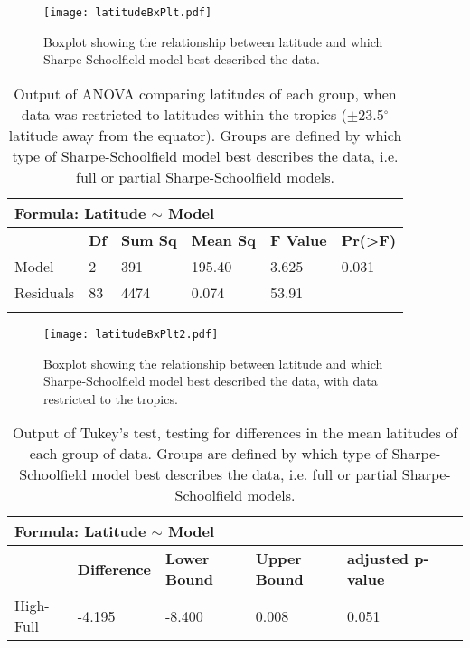\documentclass[a4paper, 11pt]{article}
\begin{document}
\begin{linenumbers}
\begin{figure}[H]
\centering
\texttt{[image: latitudeBxPlt.pdf]}
\caption{\label{fig:bxplt1} Boxplot showing the relationship between latitude and which Sharpe-Schoolfield model best described the data.}
\end{figure}


\begin{table}[ht]
\centering
\caption{Output of ANOVA comparing latitudes of each group, when data was restricted to latitudes within the tropics ($\pm$23.5$^{\circ}$ latitude away from the equator). Groups are defined by which type of Sharpe-Schoolfield model best describes the data, i.e. full or partial Sharpe-Schoolfield models.}
\vspace{0.2cm}
\label{anova2}
\begin{tabular}{llllll}
\hline
\multicolumn{6}{l}{Formula: Latitude $\sim$ Model}                                          \\ \hline
          & \textbf{Df} & \textbf{Sum Sq} & \textbf{Mean Sq} & \textbf{F Value} & \textbf{Pr(>F)} \\
Model     & 2           & 391             & 195.40           & 3.625            & 0.031           \\
Residuals & 83          & 4474            & 0.074           & 53.91            &                 \\
          &             &                 &                  &                  &                 \\
\end{tabular}
\end{table}

\begin{figure}[H]
\centering
\texttt{[image: latitudeBxPlt2.pdf]}
\caption{\label{fig:bxplt2}  Boxplot showing the relationship between latitude and which Sharpe-Schoolfield model best described the data, with data restricted to the tropics.}
\end{figure}


\begin{table}[ht]
\centering
\caption{Output of Tukey's test, testing for differences in the mean latitudes of each group of data. Groups are defined by which type of Sharpe-Schoolfield model best describes the data, i.e. full or partial Sharpe-Schoolfield models.}
\vspace{0.2cm}
\label{TukeyHSD}
\begin{tabular}{llllll}
\hline
\multicolumn{5}{l}{Formula: Latitude $\sim$ Model}                                          \\ \hline
          & \textbf{Difference} & \textbf{Lower Bound} & \textbf{Upper Bound} & \textbf{adjusted p-value} \\
High-Full &-4.195               & -8.400               & 0.008                & 0.051     \\


\end{tabular}
\end{table}
\end{linenumbers}
\end{document}
